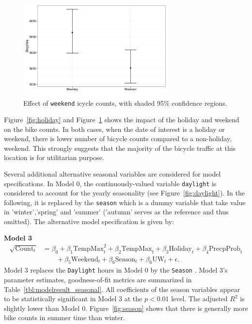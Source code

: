 \documentclass [11pt, proquest] {uwthesis}[2015/03/03]
\begin{document}
\begin{figure}
\centering
   \includegraphics[width=0.7\textwidth]{figures/sim/Wknd} 
  \caption{Effect of \texttt{weekend} icycle counts, with shaded 95\% confidence regions.}
  \label{fig:weekend}
\end{figure}

Figure~\ref{fig:holiday} and Figure~\ref{fig:weekend} shows the impact of the holiday and weekend on the bike counts. In both cases, when the date of interest is a holiday or weekend, there is lower number of bicycle counts compared to a non-holiday, weekend. This strongly suggests that the majority of the bicycle traffic at this location is for utilitarian purpose. 

%

Several additional alternative seasonal variables are considered for model specifications. In Model 0,  the continuously-valued variable \texttt{daylight} is considered to account for the yearly seasonality (see Figure~\ref{fig:daylight}). In the following, it is replaced by the \texttt{season} which is a dummy variable that take value in 'winter','spring' and 'summer' ('autumn' serves as the reference and thus omitted). The alternative model specification is given by:

\textbf{Model 3}
\begin{align}
\sqrt{\text{Count}_t} &= \beta_0 + \beta_1 \text{TempMax}^2_t + \beta_2 \text{TempMax}_t + \beta_3 \text{Holiday}_t + \beta_4 \text{PrecpProb}_t  \nonumber\\
&\qquad + \beta_5 \text{Weekend}_t + \beta_6 \text{Season}_t + \beta_6 \text{UW}_t + \epsilon.\label{eqref:model3}
\end{align}
Model 3 replaces the \texttt{Daylight} hours in Model 0 by the \texttt{Season} . Model 3's parameter estimates, goodness-of-fit metrics are summarized in Table~\ref{tbl:modelresult_seasonal}. All coefficients of the season variables appear to be  statistically significant in Model 3 at the $p<0.01$ level. The adjusted $R^2$ is slightly lower than Model 0. Figure~\ref{fig:season} shows that there is generally more bike counts in summer time than winter.
\end{document}
